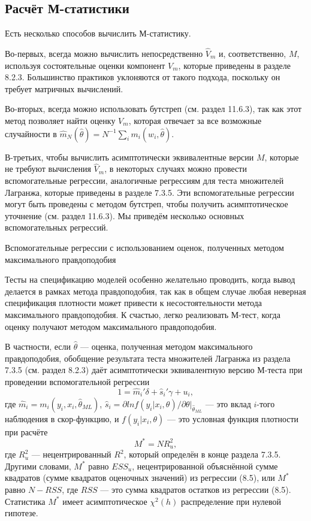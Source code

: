 \subsection{Расчёт М-статистики}

Есть несколько способов вычислить М-статистику.

Во-первых, всегда можно вычислить непосредственно $\hat{V}_m$ и, соответственно, $M$, используя состоятельные оценки компонент $V_m$, которые приведены в разделе 8.2.3. Большинство практиков уклоняются от такого подхода, поскольку он требует матричных вычислений.

Во-вторых, всегда можно использовать бутстреп (см. раздел 11.6.3), так как этот метод позволяет найти оценку $V_m$, которая отвечает за все возможные случайности в $\hat{m}_N (\hat{\theta}) = N^{-1}\sum_i m_i(w_i, \hat{\theta})$.  

В-третьих, чтобы вычислить асимптотически эквивалентные версии $M$, которые не требуют вычисления $\hat{V}_m$, в некоторых случаях можно провести вспомогательные регрессии, аналогичные регрессиям для теста множителей Лагранжа, которые приведены в разделе 7.3.5. Эти вспомогательные регрессии могут быть проведены с методом бутстреп, чтобы получить асимптотическое уточнение (см. раздел 11.6.3). Мы приведём несколько основных вспомогательных регрессий.

\begin{center}
Вспомогательные регрессии с использованием оценок, полученных методом максимального правдоподобия
\end{center}

Тесты на спецификацию моделей особенно желательно проводить, когда вывод делается в рамках метода правдоподобия, так как в общем случае любая неверная спецификация плотности может привести к несостоятельности метода максимального правдоподобия. К счастью, легко реализовать М-тест, когда оценку получают методом максимального правдоподобия.

В частности, если $\hat{\theta}$ --- оценка, полученная методом максимального правдоподобия, обобщение результата теста множителей Лагранжа из раздела 7.3.5 (см. раздел 8.2.3) даёт асимптотически эквивалентную версию М-теста при проведении вспомогательной регрессии
\begin{equation}
1 = \hat{m}_i' \delta + \hat{s}_i' \gamma + u_i,
\end{equation}
где $\hat{m}_i = m_i(y_i, x_i, \hat{\theta}_{ML})$, $\hat{s}_i = \partial{lnf(y_i|x_i, \theta)}/\partial{\theta}|_{\hat{\theta}_{ML}}$ --- это вклад $i$-того наблюдения в скор-функцию, и $f(y_i|x_i, \theta)$ --- это условная функция плотности при расчёте
\begin{equation}
M^{*} = NR_u^2,
\end{equation}
где $R_u^2$ --- нецентрированный $R^2$, который определён в конце раздела 7.3.5. Другими словами, $M^{*}$ равно $ESS_u$, нецентрированной объяснённой сумме квадратов (сумме квадратов оценочных значений) из регрессии (8.5), или $M^{*}$ равно $N - RSS$, где $RSS$ --- это сумма квадратов остатков из регрессии (8.5). Статистика $M^{*}$ имеет асимптотическое $\chi^2(h)$ распределение при нулевой гипотезе.

